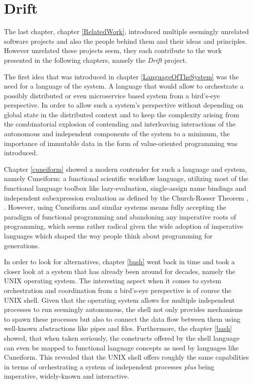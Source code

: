 \section{Drift}
\label{drift}

The last chapter, chapter \ref{RelatedWork}, introduced multiple
seemingly unrelated software projects and also the people behind
them and their ideas and principles. However unrelated these projects seem,
they each contribute to the work presented in the following
chapters, namely the \textit{Drift} project.

The first idea that was introduced in chapter \ref{LanguageOfTheSystem}
was the need for a language of the system. A language that would allow
to orchestrate a possibly distributed or even microservice based system
from a bird's-eye perspective. In order to allow such a system's
perspective without depending on global state in the distributed
context and to keep the complexity arising from the combinatorial
explosion of contending and interleaving interactions of the
autonomous and independent components of the system to a minimum,
the importance of immutable data in the form of value-oriented
programming was introduced.

Chapter \ref{cuneiform} showed a modern contender for such a
language and system, namely Cuneiform: a functional scientific
workflow language, utilizing most of the functional language
toolbox like lazy-evaluation, single-assign name bindings and
independent subexpression evaluation as defined by the
Church-Rosser Theorem \cite{churchrosser}, \cite{churchrosserwiki}.
However, using Cuneiform and similar systems means fully accepting
the paradigm of functional programming and abandoning any
imperative roots of programming, which seems rather radical given
the wide adoption of imperative languages which shaped the
way people think about programming for generations.

In order to look for alternatives, chapter \ref{bash} went back
in time and took a closer look at a system that has already been
around for decades, namely the UNIX operating system. The interesting
aspect when it comes to system orchestration and coordination from
a bird's-eye perspective is of course the UNIX shell. Given
that the operating system allows for multiple independent
processes to run seemingly autonomous, the shell not only provides
mechanisms to spawn these processes but also to connect
the data flow between them using well-known abstractions like pipes
and files. Furthermore, the chapter \ref{bash} showed, that when taken
seriously, the constructs offered by the shell language can even
be mapped to functional language concepts as used by languages
like Cuneiform. This revealed that the UNIX shell offers roughly
the same capabilities in terms of orchestrating a system of
independent processes \textit{plus} being imperative, widely-known
and interactive.

